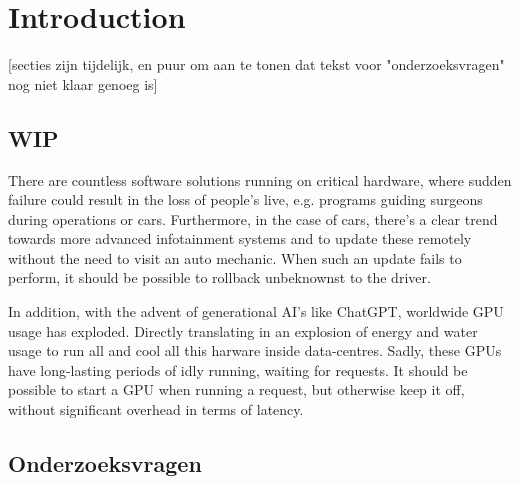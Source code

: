 \chapter{Introduction}
\label{chap:intro}

[secties zijn tijdelijk, en puur om aan te tonen dat tekst voor "onderzoeksvragen" nog niet klaar genoeg is]
\section{WIP}


There are countless software solutions running on critical hardware, where sudden failure could result in the loss of people's live, e.g. programs guiding surgeons during operations or cars. Furthermore, in the case of cars, there's a clear trend towards more advanced infotainment systems and to update these remotely without the need to visit an auto mechanic. When such an update fails to perform, it should be possible to rollback unbeknownst to the driver.


In addition, with the advent of generational AI's like ChatGPT, worldwide GPU usage has exploded. Directly translating in an explosion of energy and water usage to run all and cool all this harware inside data-centres. Sadly, these GPUs have long-lasting periods of idly running, waiting for requests. It should be possible to start a GPU when running a request, but otherwise keep it off, without significant overhead in terms of latency.


\section{Onderzoeksvragen}
